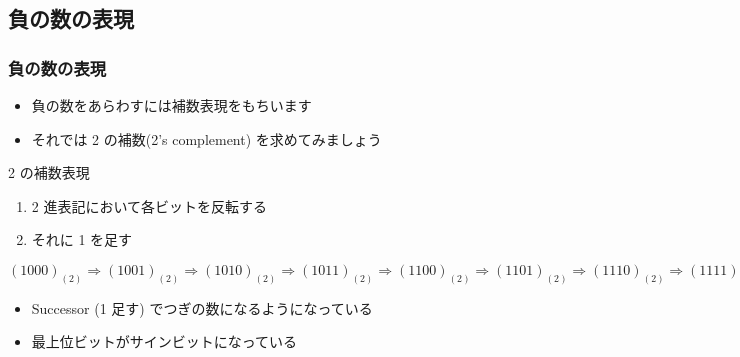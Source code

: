 \subsection{負の数の表現}
\begin{frame}[shrink]
\frametitle{負の数の表現}
  \begin{itemize}
\item 負の数をあらわすには補数表現をもちいます
\item それでは 2 の補数(2's complement) を求めてみましょう
  \end{itemize}
  \begin{block}{2 の補数表現}
    \begin{enumerate}
\item 2 進表記において各ビットを反転する
\item それに 1 を足す
    \end{enumerate}
  \end{block}
  \begin{center}
    \begin{example}
\((1000)_{(2)}\Rightarrow(1001)_{(2)}\Rightarrow(1010)_{(2)}\Rightarrow (1011)_{(2)}\Rightarrow (1100)_{(2)}
\Rightarrow(1101)_{(2)}\Rightarrow(1110)_{(2)}\Rightarrow(1111)_{(2)}
\Rightarrow(0000)_{(2)}\Rightarrow(0001)_{(2)}\Rightarrow(0010)_{(2)}\Rightarrow(0011)_{(2)}
\Rightarrow(0100)_{(2)}\Rightarrow(0101)_{(2)}\Rightarrow(0110)_{(2)}\Rightarrow(0111)_{(2)}\)\\
      \begin{itemize}
\item Successor (1 足す) でつぎの数になるようになっている
\item 最上位ビットがサインビットになっている
      \end{itemize}
    \end{example}
  \end{center}
\end{frame}
